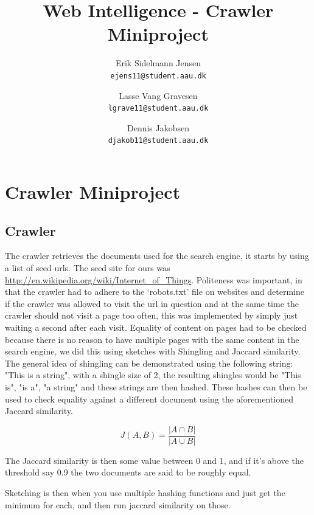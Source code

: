 

\author{
  Erik Sidelmann Jensen\\
  \texttt{ejens11@student.aau.dk}
  \and
  Lasse Vang Gravesen\\
  \texttt{lgrave11@student.aau.dk}
  \and
  Dennis Jakobsen\\
  \texttt{djakob11@student.aau.dk}  
}

\title{Web Intelligence - Crawler Miniproject}
\date{}


	\clearpage\maketitle
	\thispagestyle{empty}
	
	\chapter{Crawler Miniproject}
	\section{Crawler}
	The crawler retrieves the documents used for the search engine, it starts by using a list of seed urls.
	The seed site for ours was \url{http://en.wikipedia.org/wiki/Internet_of_Things}.
	Politeness was important, in that the crawler had to adhere to the `robots.txt' file on websites and determine if the crawler was allowed to visit the url in question and at the same time the crawler should not visit a page too often, this was implemented by simply just waiting a second after each visit. 
	Equality of content on pages had to be checked because there is no reason to have multiple pages with the same content in the search engine, we did this using sketches with Shingling and Jaccard similarity. The general idea of shingling can be demonstrated using the following string: "This is a string", with a shingle size of 2, the resulting shingles would be "This is", "is a", "a string" and these strings are then hashed. These hashes can then be used to check equality against a different document using the aforementioned Jaccard similarity. 
	
	$$ J(A,B) = \frac{| A \cap B |}{|A \cup B|} $$
	
	The Jaccard similarity is then some value between 0 and 1, and if it's above the threshold say 0.9 the two documents are said to be roughly equal.
	
	Sketching is then when you use multiple hashing functions and just get the minimum for each, and then run jaccard similarity on those.
	
